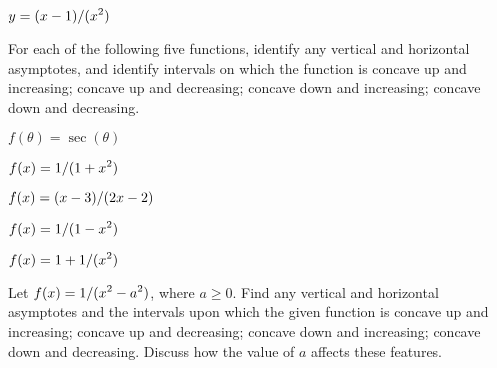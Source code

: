 \exercise $\displaystyle y=(x-1)/(x^2)$

\endtwocol

\msk
\noindent
For each of the following five functions, identify any vertical and horizontal
asymptotes, and identify intervals on which the function is 
concave up and increasing; concave up and decreasing; concave
down and increasing; concave down and decreasing.
\endexercise

\exercise $f(\theta)=\sec(\theta)$
\endexercise

\exercise $\displaystyle f(x) = 1/(1+x^2)$
\endexercise

\exercise $\displaystyle f(x) = (x-3)/(2x-2)$ 
\endexercise

\exercise $\displaystyle f(x) = 1/(1-x^2)$
\endexercise

\exercise $\displaystyle f(x) = 1+1/(x^2)$
\endexercise

\exercise Let $\displaystyle f(x) = 1/(x^2-a^2)$, where $a\geq0$.  Find any
 vertical and horizontal asymptotes and the intervals upon which the
 given function is concave up and increasing; concave up and
 decreasing; concave down and increasing; concave down and decreasing.
 Discuss how the value of $a$ affects these features.



\endexercise

\endexercises
